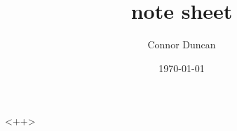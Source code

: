 \documentclass[twocolumn]{article}
\author{Connor Duncan}
\title{note sheet}
\date{\today}
\begin{document}
<++>
\end{document}

